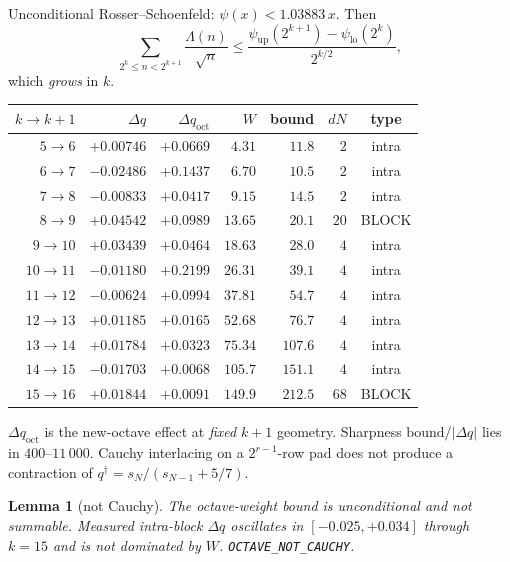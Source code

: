 \documentclass[11pt]{article}
\newtheorem{lemma}{Lemma}
\begin{document}
Unconditional Rosser--Schoenfeld:
$\psi(x)<1.03883\,x$.
Then
\[
\sum_{2^k\le n<2^{k+1}}\frac{\Lambda(n)}{\sqrt n}
\le
\frac{\psi_{\mathrm{up}}(2^{k+1})-\psi_{\mathrm{lo}}(2^k)}{2^{k/2}},
\]
which \emph{grows} in $k$.

\begin{center}
\scriptsize
\begin{tabular}{@{}rrrrrrc@{}}
\toprule
$k\to k{+}1$ & $\Delta q$ & $\Delta q_{\mathrm{oct}}$ &
 $W$ & bound & $dN$ & type \\
\midrule
$5\to6$  & $+0.00746$ & $+0.0669$ & $4.31$  & $11.8$  & $2$  & intra \\
$6\to7$  & $-0.02486$ & $+0.1437$ & $6.70$  & $10.5$  & $2$  & intra \\
$7\to8$  & $-0.00833$ & $+0.0417$ & $9.15$  & $14.5$  & $2$  & intra \\
$8\to9$  & $+0.04542$ & $+0.0989$ & $13.65$ & $20.1$  & $20$ & BLOCK \\
$9\to10$ & $+0.03439$ & $+0.0464$ & $18.63$ & $28.0$  & $4$  & intra \\
$10\to11$& $-0.01180$ & $+0.2199$ & $26.31$ & $39.1$  & $4$  & intra \\
$11\to12$& $-0.00624$ & $+0.0994$ & $37.81$ & $54.7$  & $4$  & intra \\
$12\to13$& $+0.01185$ & $+0.0165$ & $52.68$ & $76.7$  & $4$  & intra \\
$13\to14$& $+0.01784$ & $+0.0323$ & $75.34$ & $107.6$ & $4$  & intra \\
$14\to15$& $-0.01703$ & $+0.0068$ & $105.7$ & $151.1$ & $4$  & intra \\
$15\to16$& $+0.01844$ & $+0.0091$ & $149.9$ & $212.5$ & $68$ & BLOCK \\
\bottomrule
\end{tabular}
\end{center}

$\Delta q_{\mathrm{oct}}$ is the new-octave effect at
\emph{fixed} $k{+}1$ geometry.
Sharpness $\mathrm{bound}/|\Delta q|$ lies in
$400$--$11\,000$.
Cauchy interlacing on a $2^{r-1}$-row pad does not
produce a contraction of $q^{\dagger}=s_N/(s_{N-1}+5/7)$.

\begin{lemma}[not Cauchy]\label{lem:nocauchy}
The octave-weight bound is unconditional and not
summable.
Measured intra-block $\Delta q$ oscillates in
$[-0.025,+0.034]$ through $k=15$ and is not
dominated by $W$.
\texttt{OCTAVE\_NOT\_CAUCHY}.
\end{lemma}
\end{document}
